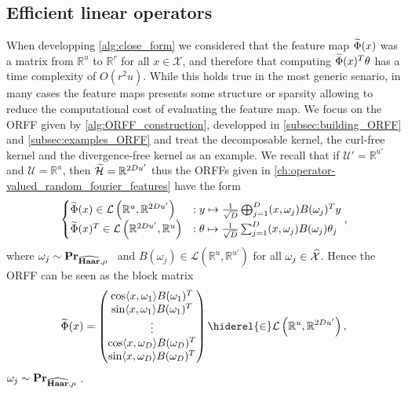 \subsection{Efficient linear operators}
When developping \cref{alg:close_form} we considered that the feature map $\widetilde{\Phi}(x)$ was a matrix from $\mathbb{R}^u$ to $\mathbb{R}^{r}$ for all $x\in\mathcal{X}$, and therefore that computing $\widetilde{\Phi}(x)^T \theta$ has a time complexity of $O(r^2u)$. While this holds true in the most generic senario, in many cases the feature maps presents some structure or sparsity allowing to reduce the computational cost of evaluating the feature map. We focus on the \acl{ORFF} given by \cref{alg:ORFF_construction}, developped in \cref{subsec:building_ORFF} and \cref{subsec:examples_ORFF} and treat the decomposable kernel, the curl-free kernel and the divergence-free kernel as an example. We recall that if $\mathcal{U}'=\mathbb{R}^{u'}$ and $\mathcal{U}=\mathbb{R}^u$, then $\widetilde{\mathcal{H}}=\mathbb{R}^{2Du'}$ thus the \acl{ORFF}s given in \cref{ch:operator-valued_random_fourier_features} have the form
\begin{dmath*}
\begin{cases}\tildePhi{\omega}(x) \in\mathcal{L}\left(\mathbb{R}^u, \mathbb{R}^{2Du'}\right) &:  y \mapsto \frac{1}{\sqrt{D}}\Vect_{j=1}^D\pairing{x, \omega_j}B(\omega_j)^T y \\ \tildePhi{\omega}(x)^T \in\mathcal{L}\left(\mathbb{R}^{2Du'}, \mathbb{R}^u\right) &: \theta \mapsto \frac{1}{\sqrt{D}} \sum_{j=1}^D \pairing{x, \omega_j}B(\omega_j)\theta_j \end{cases},
\end{dmath*}
where $\omega_j\sim{\mathbf{{Pr}}}_{\widehat{\mathbf{Haar}}, \rho}$ \iid~and $B(\omega_j)\in\mathcal{L}\left(\mathbb{R}^u,\mathbb{R}^{u'}\right)$ for all $\omega_j\in\widehat{\mathcal{X}}$. Hence the \acl{ORFF} can be seen as the block matrix
\begin{dmath}
\label{eq:matrix_orff}
\tildePhi{\omega}(x) = \begin{pmatrix} \cos\inner{x,\omega_1}B(\omega_1)^T \\
\sin\inner{x,\omega_1}B(\omega_1)^T \\
\vdots \\
\cos\inner{x,\omega_D}B(\omega_D)^T \\
\sin\inner{x,\omega_D}B(\omega_D)^T
\end{pmatrix}\hiderel{\in}\mathcal{L}\left(\mathbb{R}^u, \mathbb{R}^{2Du'}\right),
\end{dmath}
$\omega_j\sim{\mathbf{{Pr}}}_{\widehat{\mathbf{Haar}}, \rho}$ \iid.
